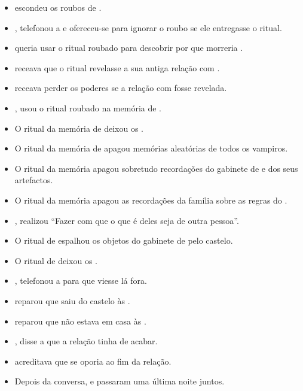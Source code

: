 \begin{itemize}
  \item {} escondeu os roubos de .
  \item {},  telefonou a  e ofereceu-se para ignorar o roubo se ele entregasse o ritual.
  \item {} queria usar o ritual roubado para descobrir por que morreria .
  \item {} receava que o ritual revelasse a sua antiga relação com .
  \item {} receava perder os poderes se a relação com  fosse revelada.
  \item {},  usou o ritual roubado na memória de .
  \item O ritual da memória de  deixou os .
  \item O ritual da memória de  apagou memórias aleatórias de todos os vampiros.
  \item O ritual da memória apagou sobretudo recordações do gabinete de  e dos seus artefactos.
  \item O ritual da memória apagou as recordações da família sobre as regras do .
  \item {},  realizou ``Fazer com que o que é deles seja de outra pessoa''.
  \item O ritual de  espalhou os objetos do gabinete de  pelo castelo.
  \item O ritual de  deixou os .
  \item {},  telefonou a  para que viesse lá fora.
  \item {} reparou que  saiu do castelo às .
  \item {} reparou que  não estava em casa às .
  \item {},  disse a  que a relação tinha de acabar.
  \item {} acreditava que  se oporia ao fim da relação.
  \item Depois da conversa,  e  passaram uma última noite juntos.


\end{itemize}
